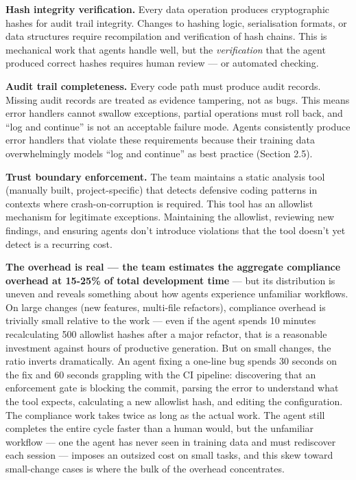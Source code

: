 \documentclass[a4paper,11pt]{report}
\begin{document}
\textbf{Hash integrity verification.} Every data operation produces
cryptographic hashes for audit trail integrity. Changes to hashing
logic, serialisation formats, or data structures require recompilation
and verification of hash chains. This is mechanical work that agents
handle well, but the \emph{verification} that the agent produced correct
hashes requires human review --- or automated checking.

\textbf{Audit trail completeness.} Every code path must produce audit
records. Missing audit records are treated as evidence tampering, not as
bugs. This means error handlers cannot swallow exceptions, partial
operations must roll back, and ``log and continue'' is not an acceptable
failure mode. Agents consistently produce error handlers that violate
these requirements because their training data overwhelmingly models
``log and continue'' as best practice (Section 2.5).

\textbf{Trust boundary enforcement.} The team maintains a static
analysis tool (manually built, project-specific) that detects defensive
coding patterns in contexts where crash-on-corruption is required. This
tool has an allowlist mechanism for legitimate exceptions. Maintaining
the allowlist, reviewing new findings, and ensuring agents don't
introduce violations that the tool doesn't yet detect is a recurring
cost.

\textbf{The overhead is real --- the team estimates the aggregate
compliance overhead at 15-25\% of total development time} --- but its
distribution is uneven and reveals something about how agents experience
unfamiliar workflows. On large changes (new features, multi-file
refactors), compliance overhead is trivially small relative to the work
--- even if the agent spends 10 minutes recalculating 500 allowlist
hashes after a major refactor, that is a reasonable investment against
hours of productive generation. But on small changes, the ratio inverts
dramatically. An agent fixing a one-line bug spends 30 seconds on the
fix and 60 seconds grappling with the CI pipeline: discovering that an
enforcement gate is blocking the commit, parsing the error to understand
what the tool expects, calculating a new allowlist hash, and editing the
configuration. The compliance work takes twice as long as the actual
work. The agent still completes the entire cycle faster than a human
would, but the unfamiliar workflow --- one the agent has never seen in
training data and must rediscover each session --- imposes an outsized
cost on small tasks, and this skew toward small-change cases is where
the bulk of the overhead concentrates.
\end{document}
